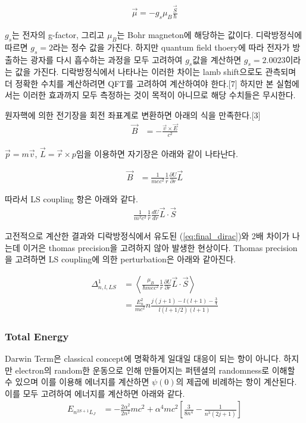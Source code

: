 \documentclass[%
 reprint,
 amsmath,amssymb,
 aps,
]{revtex4-2}
\begin{document}
\begin{align}
	\vec{\mu} = -g_{s}\mu_{B}\frac{\vec{S}}{\hbar}
\end{align}

$g_{s}$는 전자의 g-factor, 그리고 $\mu_{B}$는 Bohr magneton에 해당하는 값이다. 디락방정식에 따르면 $g_{s}=2$라는 정수 값을 가진다. 하지만 quantum field thoery에 따라 전자가 방출하는 광자를 다시 흡수하는 과정을 모두 고려하여 $g_{s}$값을 계산하면 $g_{s} = 2.0023$이라는 값을 가진다. 디락방정식에서 나타나는 이러한 차이는 lamb shift으로도 관측되며 더 정확한 수치를 계산하려면 QFT를 고려하여 계산하여야 한다.[7] 하지만 본 실험에서는 이러한 효과까지 모두 측정하는 것이 목적이 아니므로 해당 수치들은 무시한다.

원자핵에 의한 전기장을 회전 좌표계로 변환하면 아래의 식을 만족한다.[3]
\begin{align}
	\vec{B} &= -\frac{\vec{v}\times\vec{E}}{c^{2}}
\end{align}

$\vec{p} = m\vec{v}$, $\vec{L} = \vec{r}\times{p}$임을 이용하면 자기장은 아래와 같이 나타난다.

\begin{align}
	\vec{B} &= \frac{1}{mec^{2}}\frac{1}{r}\frac{\partial U}{\partial r} \vec{L}
\end{align}

따라서 LS coupling 항은 아래와 같다.
\begin{align}
	\frac{1}{m^{2}c^{2}}\frac{1}{r}\frac{dU}{dr}\vec{L}\cdot\vec{S}
\end{align}

고전적으로 계산한 결과와 디락방정식에서 유도된 (\ref{eq:final_dirac})와 2배 차이가 나는데 이거은 thomas precision을 고려하지 않아 발생한 현상이다. Thomas precision을 고려하면 LS coupling에 의한 perturbation은 아래와 같아진다.

\begin{align}
	\Delta^{1}_{n,l,LS} &= \left<\frac{\mu_{B}}{\hbar m e c^{2}}\frac{1}{r}\frac{\partial U}{\partial r}\vec{L}\cdot\vec{S}\right>\\
	&=\frac{E_{n}^{2}}{mc^{2}}n\frac{j(j+1)-l(l+1)-\frac{3}{4}}{l(l+1/2)(l+1)}
\end{align}


\subsubsection{\label{sec:level2}Total Energy}
Darwin Term은 classical concept에 명확하게 일대일 대응이 되는 항이 아니다. 하지만 electron의 random한 운동으로 인해 만들어지는 퍼텐셜의 randomness로 이해할 수 있으며 이를 이용해 에너지를 계산하면 $\psi(0)$의 제곱에 비례하는 항이 계산된다. 이를 모두 고려하여 에너지를 계산하면 아래와 같다.
\begin{align}
	E_{n^{2S+1}L_{J}} &= -\frac{2\alpha^{2}}{2n^{2}}mc^{2} + \alpha^{4}mc^{2}\left[\frac{3}{8n^{4}}-\frac{1}{n^{3}(2j+1)}\right]
\end{align}
\end{document}
